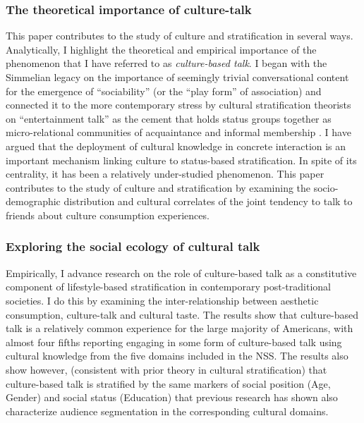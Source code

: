 \documentclass[11pt]{article}
\begin{document}
\subsubsection{The theoretical importance of culture-talk}
This paper contributes to the study of culture and stratification in several ways.  Analytically, I highlight the theoretical and empirical importance of the phenomenon that I have referred to as \emph{culture-based talk}. I began with the Simmelian legacy on the importance of seemingly trivial conversational content for the emergence of ``sociability'' (or the ``play form'' of association) and connected it to the more contemporary stress by cultural stratification theorists on ``entertainment talk'' as the cement that holds status groups together as micro-relational communities of acquaintance and informal membership \citep{collins75, dimaggio87, purcell07, lizardo06a}.  I have argued that the deployment of cultural knowledge in concrete interaction is an important mechanism linking culture to status-based stratification.  In spite of its centrality, it has been a relatively under-studied phenomenon. This paper contributes to the study of culture and stratification by examining the socio-demographic distribution and cultural correlates of the joint tendency to talk to friends about culture consumption experiences.  

\subsubsection{Exploring the social ecology of cultural talk}
Empirically, I advance research on the role of culture-based talk as a constitutive component of lifestyle-based stratification in contemporary post-traditional societies.  I do this by examining the inter-relationship between aesthetic consumption, culture-talk and cultural taste. The results show that culture-based talk is a relatively common experience for the large majority of Americans, with almost four fifths reporting engaging in some form of culture-based talk using cultural knowledge from the five domains included in the NSS. The results also show however, (consistent with prior theory in cultural stratification) that culture-based talk is stratified by the same markers of social position (Age, Gender) and social status (Education) that previous research has shown also characterize audience segmentation in the corresponding cultural domains.  
\end{document}
